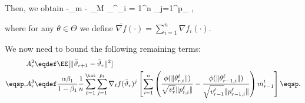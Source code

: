 \documentclass[11pt]{article}
\begin{document}
Then, we obtain
\beq\label{eq:finala1}
\EE[A_1]  \leq -\alpha \phi_m     -  \alpha \phi_M \sum_{}^\tot \sum_{i = 1}^n \sum_{j=1}^{p_\ell}  \eqsp,
\eeq

where  for any $\theta \in \Theta$ we define $\overline{\nabla f}( \cdot) = \sum_{i=1}^n \nabla f_i(\cdot)$.

We now need to bound the following remaining terms:
\begin{align}\notag
& A_r^2 \eqdef \EE[  \| \bar{\vartheta}_{r+1} - \bar{\vartheta}_r \|^2]\\\notag\eqsp,
& A_r^3 \eqdef  \frac{\alpha \beta_1}{1-\beta_1}  \frac{1}{n} \sum_{\ell=1}^\tot \sum_{j=1}^{p_\ell} \nabla_{\ell} f(\bar{\vartheta}_r)^j \left[   \sum_{i = 1}^n  \left( \frac{\phi(\|\theta_{r,i}^{\ell}\|)}{\sqrt{v^{t}_{r}} \|p_{r,i}^{\ell}\|} - \frac{\phi(\|\theta_{r-1,i}^{\ell}\|)}{\sqrt{v^{t}_{r-1}} \|p_{r-1,i}^{\ell}\|} \right) m^{t}_{r-1}  \right] \eqsp.
\end{align}
\end{document}
